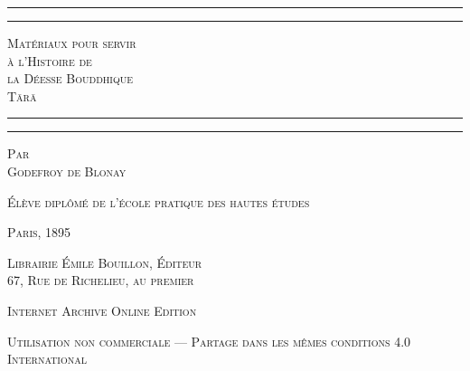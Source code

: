 \documentclass[a4paper, 11pt, oneside, french]{article}
\begin{document}
\sloppy
\begin{titlepage} %
	\centering %

	
	\rule{\textwidth}{1.6pt}\vspace*{-\baselineskip}\vspace*{2pt} %
	\rule{\textwidth}{0.4pt} %
	
	\vspace{1\baselineskip} %

	{\scshape\Huge Matériaux pour servir\\ à l'Histoire de \\la Déesse Bouddhique \\T\={a}r\={a}}
	
	\vspace{1\baselineskip} %

	\rule{\textwidth}{0.4pt}\vspace*{-\baselineskip}\vspace{3.2pt} %
	\rule{\textwidth}{1.6pt} %
	
	\vspace{1\baselineskip} %
	
	
	{\scshape Par \\\Large Godefroy de Blonay} %
	
	\vspace*{1\baselineskip} %
	
        {\scshape Élève diplômé de l'école pratique des hautes études} %
    
        \vspace*{\fill}

	\vspace{1\baselineskip}

	{\small\scshape Paris, 1895}
	
	{\small\scshape{Librairie Émile Bouillon, Éditeur\\67, Rue de Richelieu, au premier}}
	
	\vspace{0.5\baselineskip} %

        \scshape Internet Archive Online Edition  %
	
	{\scshape\small Utilisation non commerciale --- Partage dans les mêmes conditions 4.0 International} %
\end{titlepage}
\setlength{\parskip}{1mm plus1mm minus1mm}
\clearpage
\tableofcontents
\clearpage
\end{document}
